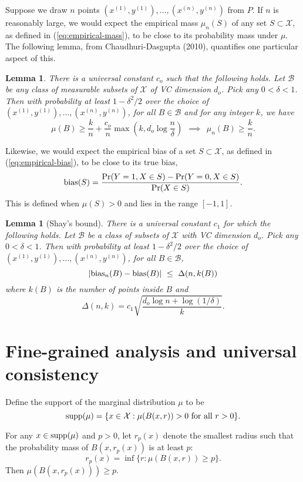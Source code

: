 \documentclass{article}
\def\pr{{\rm Pr}}
\def\X{{\mathcal X}}
\def\B{{\mathcal B}}
\def\bias{{\rm bias}}
\def\supp{{\rm supp}}
\newtheorem{lemma}[thm]{Lemma}
\begin{document}
Suppose we draw $n$ points $(x^{(1)}, y^{(1)}), \ldots, (x^{(n)}, y^{(n)})$ from $P$. If $n$ is reasonably large, we would expect the empirical mass $\mu_n(S)$ of any set $S \subset \X$, as defined in (\ref{eq:empirical-mass}), to be close to its probability mass under $\mu$. The following lemma, from Chaudhuri-Dasgupta (2010), quantifies one particular aspect of this.
\begin{lemma}
There is a universal constant $c_o$ such that the following holds. Let $\B$ be any class of measurable subsets of $\X$ of VC dimension $d_o$. Pick any $0 < \delta < 1$. Then with probability at least $1-\delta^2/2$ over the choice of $(x^{(1)}, y^{(1)}), \ldots, (x^{(n)}, y^{(n)})$, for all $B \in \B$ and for any integer $k$, we have
$$ \mu(B) \geq \frac{k}{n} + \frac{c_o}{n} \max \left( k, d_o \log \frac{n}{\delta} \right)
\ \ \implies \ \ 
\mu_n(B) \geq \frac{k}{n} .$$
\label{lemma:points-in-balls}
\end{lemma}

Likewise, we would expect the empirical bias of a set $S \subset \X$, as defined in (\ref{eq:empirical-bias}), to be close to its true bias,
$$ \bias(S) = \frac{\pr(Y = 1, X \in S) - \pr(Y = 0, X \in S)}{\pr(X \in S)} .$$
This is defined when $\mu(S) > 0$ and lies in the range $[-1,1]$.

\begin{lemma}[Shay's bound]
There is a universal constant $c_1$ for which the following holds. Let $\B$ be a class of subsets of $\X$ with VC dimension $d_o$. Pick any $0 < \delta < 1$. Then with probability at least $1-\delta^2/2$ over the choice of $(x^{(1)}, y^{(1)}), \ldots, (x^{(n)}, y^{(n)})$, for all $B \in \B$,
  $$ \left| \bias_n(B) - \bias(B) \right| \ \leq \ \Delta(n, k(B)) $$
where $k(B)$ is the number of points inside $B$ and 
\begin{equation}
\Delta(n,k) = c_1 \sqrt{\frac{d_o \log n + \log (1/\delta)}{k}} .
\label{eq:delta-defn}
\end{equation}
\label{lemma:bias}
\end{lemma}

\section{Fine-grained analysis and universal consistency}

Define the support of the marginal distribution $\mu$ to be
$$ \supp(\mu) = \{x \in \X: \mbox{$\mu(B(x,r)) > 0$ for all $r > 0$}\} .$$

For any $x \in \supp(\mu)$ and $p > 0$, let $r_p(x)$ denote the smallest radius such that the probability mass of $B(x, r_p(x))$ is at least $p$:
$$ r_p(x) = \inf \{r: \mu(B(x,r)) \geq p \} .$$
Then $\mu(B(x,r_p(x))) \geq p$.
\end{document}
